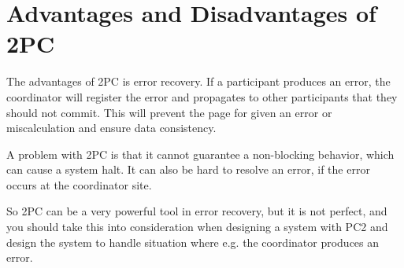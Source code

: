 \section{Advantages and Disadvantages of 2PC}
The advantages of 2PC is error recovery. If a participant produces an error, the coordinator will register the error and propagates to other participants that they should not commit. This will prevent the page for given an error or miscalculation and ensure data consistency.

A problem with 2PC is that it cannot guarantee a non-blocking behavior, which can cause a system halt. It can also be hard to resolve an error, if the error occurs at the coordinator site.

So 2PC can be a very powerful tool in error recovery, but it is not perfect, and you should take this into consideration when designing a system with PC2 and design the system to handle situation where e.g. the coordinator produces an error.